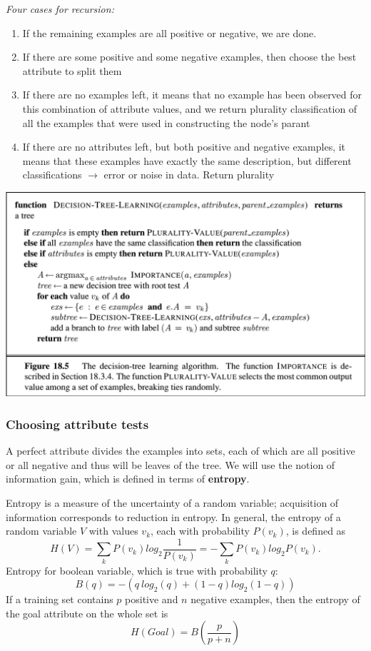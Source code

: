 \documentclass{scrartcl}
\begin{document}
\bigbreak

\textit{Four cases for recursion:}
\begin{enumerate}
    \item
        If the remaining examples are all positive or negative, we are done.
    \item
        If there are some positive and some negative examples, then choose the best attribute to split them
    \item
        If there are no examples left, it means that no example has been observed for this combination of attribute values, and we return plurality classification of all the examples that were used in constructing the node's parant
    \item
        If there are no attributes left, but both positive and negative examples, it means that these examples have exactly the same description, but different classifications \(\rightarrow\) error or noise in data. Return plurality
\end{enumerate}

\begin{center}
    \includegraphics[scale=0.4]{img/dectree.png}
\end{center}

\subsubsection{Choosing attribute tests}
A perfect attribute divides the examples into sets, each of which are all positive or all negative and thus will be leaves of the tree. We will use the notion of information gain, which is defined in terms of \textbf{entropy}.

Entropy is a measure of the uncertainty of a random variable; acquisition of information corresponds to reduction in entropy. In general, the entropy of a random variable \(V\) with values \(v_k\), each with probability \(P(v_k)\), is defined as
\[H(V) = \sum_k P(v_k) log_2 \frac{1}{P(v_k)} = - \sum_k P(v_k) log_2 P(v_k).\]
Entropy for boolean variable, which is true with probability \(q\):
\[B(q) = -(q \ log_2(q) + (1-q) log_2 (1-q))\]
If a training set contains \(p\) positive and \(n\) negative examples, then the entropy of the goal attribute on the whole set is
\[H(Goal) = B(\frac{p}{p+n})\]
\end{document}

